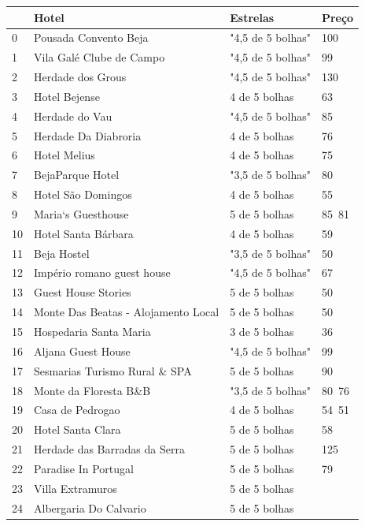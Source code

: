 \documentclass[a4paper,10pt]{article}
\begin{document}
\begin{table}[!ht]
  \centering
  \begin{tabular}{|l|l|l|l|}
  \hline
      ~ & Hotel & Estrelas & Preço \\ \hline
      0 & Pousada Convento Beja & "4,5 de 5 bolhas" & 100 \\ \hline
      1 & Vila Galé Clube de Campo & "4,5 de 5 bolhas" & 99 \\ \hline
      2 & Herdade dos Grous & "4,5 de 5 bolhas" & 130 \\ \hline
      3 & Hotel Bejense & 4 de 5 bolhas & 63 \\ \hline
      4 & Herdade do Vau & "4,5 de 5 bolhas" & 85 \\ \hline
      5 & Herdade Da Diabroria & 4 de 5 bolhas & 76 \\ \hline
      6 & Hotel Melius & 4 de 5 bolhas & 75 \\ \hline
      7 & BejaParque Hotel & "3,5 de 5 bolhas" & 80 \\ \hline
      8 & Hotel São Domingos & 4 de 5 bolhas & 55 \\ \hline
      9 & Maria`s Guesthouse & 5 de 5 bolhas & 85 81 \\ \hline
      10 & Hotel Santa Bárbara & 4 de 5 bolhas & 59 \\ \hline
      11 & Beja Hostel & "3,5 de 5 bolhas" & 50 \\ \hline
      12 & Império romano guest house & "4,5 de 5 bolhas" & 67 \\ \hline
      13 & Guest House Stories & 5 de 5 bolhas & 50 \\ \hline
      14 & Monte Das Beatas - Alojamento Local & 5 de 5 bolhas & 50 \\ \hline
      15 & Hospedaria Santa Maria & 3 de 5 bolhas & 36 \\ \hline
      16 & Aljana Guest House & "4,5 de 5 bolhas" & 99 \\ \hline
      17 & Sesmarias Turismo Rural \& SPA & 5 de 5 bolhas & 90 \\ \hline
      18 & Monte da Floresta B\&B & "3,5 de 5 bolhas" & 80 76 \\ \hline
      19 & Casa de Pedrogao & 4 de 5 bolhas & 54 51 \\ \hline
      20 & Hotel Santa Clara & 5 de 5 bolhas & 58 \\ \hline
      21 & Herdade das Barradas da Serra & 5 de 5 bolhas & 125 \\ \hline
      22 & Paradise In Portugal & 5 de 5 bolhas & 79 \\ \hline
      23 & Villa Extramuros & 5 de 5 bolhas & ~ \\ \hline
      24 & Albergaria Do Calvario & 5 de 5 bolhas & ~ \\ \hline
  \end{tabular}
\end{table}
\end{document}
